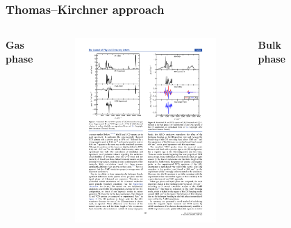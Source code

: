 \documentclass[t]{beamer}
\begin{document}
	\begin{frame}
	    \frametitle{Thomas--Kirchner approach}
	    \vspace{-.25cm}
        \begin{columns}
            \centering
            \textbf{Gas phase}
            \vspace{-.25cm}
            \begin{figure}
                \includegraphics[width=.95\textwidth]{figures/butanol_gas_vcd.pdf}
            \end{figure} 
            \centering
            \textbf{Bulk phase}
            \vspace{-.25cm}
            \begin{figure}

\end{figure}
\end{columns}
\end{frame}
\end{document}
